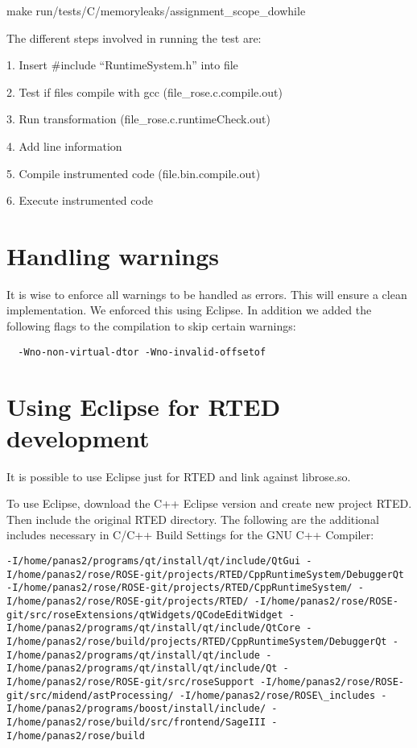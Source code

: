   make run/tests/C/memoryleaks/assignment\_scope\_dowhile

The different steps involved in running the test are:

1. Insert \#include ``RuntimeSystem.h'' into file

2. Test if files compile with gcc (file\_rose.c.compile.out)

3. Run transformation (file\_rose.c.runtimeCheck.out)

4. Add line information

5. Compile instrumented code (file.bin.compile.out)

6. Execute instrumented code



\section{Handling warnings}

It is wise to enforce all warnings to be handled as errors. This will ensure a clean implementation. We enforced this using Eclipse.
In addition we added the following flags to the compilation to skip certain warnings:

\begin{verbatim}
  -Wno-non-virtual-dtor -Wno-invalid-offsetof 
\end{verbatim}

\section{Using Eclipse for RTED development}

It is possible to use Eclipse just for RTED and link against librose.so.

To use Eclipse, download the C++ Eclipse version and create new project RTED.
Then include the original RTED directory. The following are the additional includes necessary in C/C++ Build Settings for the GNU C++ Compiler:

\begin{verbatim}
-I/home/panas2/programs/qt/install/qt/include/QtGui -I/home/panas2/rose/ROSE-git/projects/RTED/CppRuntimeSystem/DebuggerQt -I/home/panas2/rose/ROSE-git/projects/RTED/CppRuntimeSystem/ -I/home/panas2/rose/ROSE-git/projects/RTED/ -I/home/panas2/rose/ROSE-git/src/roseExtensions/qtWidgets/QCodeEditWidget -I/home/panas2/programs/qt/install/qt/include/QtCore -I/home/panas2/rose/build/projects/RTED/CppRuntimeSystem/DebuggerQt -I/home/panas2/programs/qt/install/qt/include -I/home/panas2/programs/qt/install/qt/include/Qt -I/home/panas2/rose/ROSE-git/src/roseSupport -I/home/panas2/rose/ROSE-git/src/midend/astProcessing/ -I/home/panas2/rose/ROSE\_includes -I/home/panas2/programs/boost/install/include/ -I/home/panas2/rose/build/src/frontend/SageIII -I/home/panas2/rose/build 
\end{verbatim}


